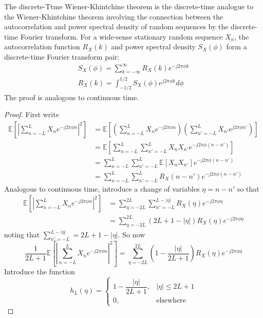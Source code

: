 \documentclass[11pt]{report} %
\begin{document}
The discrete-Ttme Wiener-Khintchine theorem is the discrete-time analogue to the Wiener-Khintchine theorem involving the connection between the autocorrelation and power spectral density of random sequences by the discrete-time Fourier transform. For a wide-sense stationary random sequence $X_{n}$, the autocorrelation function $R_{X}\left(k\right)$ and power spectral density $S_{X}\left(\phi\right)$ form a discrete-time Fourier transform pair:
\begin{gather}
S_{X}\left(\phi\right) = \sum_{k = -\infty}^{\infty}R_{X}\left(k\right)e^{-j2\pi\phi k} \\
R_{X}\left(k\right) = \int_{-1/2}^{1/2}S_{X}\left(\phi\right)e^{j2\pi\phi k}d\phi
\end{gather}
The proof is analogous to continuous time.
\begin{proof}
First write
\begin{align}
\mathbb{E}\left[\left|\sum_{n=-L}^{L}X_{n}e^{-j2\pi\phi n}\right|^{2}\right] &= \mathbb{E}\left[\left(\sum_{n=-L}^{L}X_{n}e^{-j2\pi\phi n}\right)\left(\sum_{n'=-L}^{L}X_{n'}e^{j2\pi\phi n'}\right)\right] \\
&= \mathbb{E}\left[\sum_{n=-L}^{L}\sum_{n'=-L}^{L}X_{n}X_{n'}e^{-j2\pi\phi\left(n-n'\right)}\right] \\
&= \sum_{n=-L}^{L}\sum_{n'=-L}^{L}\mathbb{E}\left[X_{n}X_{n'}\right]e^{-j2\pi\phi\left(n-n'\right)} \\
&= \sum_{n=-L}^{L}\sum_{n'=-L}^{L}R_{X}\left(n-n'\right)e^{-j2\pi\phi\left(n-n'\right)}
\end{align}
Analogous to continuous time, introduce a change of variables $\eta = n - n'$ so that
\begin{align}
\mathbb{E}\left[\left|\sum_{n=-L}^{L}X_{n}e^{-j2\pi\phi n}\right|^{2}\right] &= \sum_{\eta=-2L}^{2L}\sum_{n'=-L}^{L-\left|\eta\right|}R_{X}\left(\eta\right)e^{-j2\pi\phi\eta} \\
&= \sum_{\eta=-2L}^{2L}\left(2L+1-\left|\eta\right|\right)R_{X}\left(\eta\right)e^{-j2\pi\phi\eta}
\end{align}
noting that $\sum_{n'=-L}^{L-\left|\eta\right|} = 2L + 1 - \left|\eta\right|$. So now
\begin{equation}
\dfrac{1}{2L+1}\mathbb{E}\left[\left|\sum_{n=-L}^{L}X_{n}e^{-j2\pi\phi n}\right|^{2}\right]=\sum_{\eta=-2L}^{2L}\left(1-\dfrac{\left|\eta\right|}{2L+1}\right)R_{X}\left(\eta\right)e^{-j2\pi\phi\eta}
\end{equation}
Introduce the function
\begin{equation}
h_{L}\left(\eta\right)= \begin{cases} 1-\dfrac{\left|\eta\right|}{2L+1}, & \left|\eta\right| \leq 2L + 1 \\ 0, & \mathrm{elsewhere}\end{cases}

\end{equation}
\end{proof}
\end{document}
